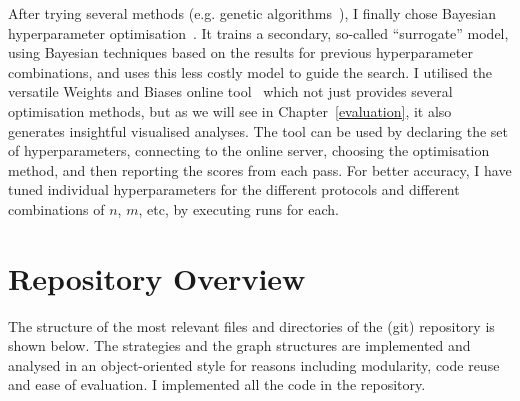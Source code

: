 After trying several methods (e.g. genetic algorithms~\cite{wicaksono2018genetichyper}), I finally chose Bayesian hyperparameter optimisation~\cite{eggensperger2013bayesianhyper}. It trains a secondary, so-called ``surrogate'' model, using Bayesian techniques based on the results for previous hyperparameter combinations, and uses this less costly model to guide the search. I utilised the versatile Weights and Biases online tool~\cite{biewald2020wandb} which not just provides several optimisation methods, but as we will see in Chapter~\ref{evaluation}, it also generates insightful visualised analyses. The tool can be used by declaring the set of hyperparameters, connecting to the online server, choosing the optimisation method, and then reporting the scores from each pass. For better accuracy, I have tuned individual hyperparameters for the different protocols and different combinations of $n$, $m$, etc, by executing \NumberofHyperparameterIterations runs for each.

\section{Repository Overview}

The structure of the most relevant files and directories of the (git) repository is shown below. The strategies and the graph structures are implemented and analysed in an object-oriented style for reasons including modularity, code reuse and ease of evaluation. I implemented all the code in the repository.



